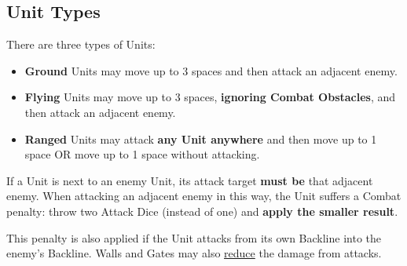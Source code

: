 \begin{multicols}{2}
\vspace*{\fill}

\columnbreak

\subsection*{\hypertarget{Unittype}{Unit Types}}
There are three types of Units:
\begin{itemize}
  \item \textbf{Ground}  Units may move up to 3 spaces and then attack an adjacent enemy.
  \item \textbf{Flying}  Units may move up to 3 spaces, \textbf{ignoring Combat Obstacles}, and then attack an adjacent enemy.
  \item \textbf{Ranged}  Units may attack \textbf{any Unit anywhere} and then move up to 1 space OR move up to 1 space without attacking.
\end{itemize}
If a  Unit is next to an enemy Unit, its attack target \textbf{must be} that adjacent enemy.
When attacking an adjacent enemy in this way, the  Unit suffers a Combat penalty: throw two Attack Dice (instead of one) and \textbf{apply the smaller result}.\par
This penalty is also applied if the  Unit attacks from its own Backline into the enemy's Backline.
Walls and Gates may also \hyperlink{Walls}{reduce} the damage from   attacks.


\end{multicols}

